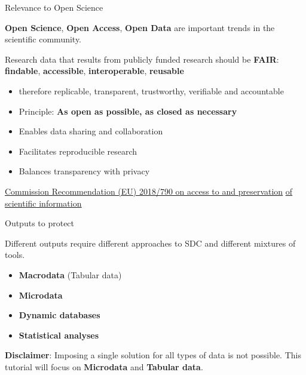 \documentclass[
	aspectratio = 169
 ]{beamer}
\begin{document}
\begin{frame}{Relevance to Open Science}

\textbf{Open Science}, \textbf{Open Access}, \textbf{Open Data} are
important trends in the scientific community.

Research data that results from publicly funded research should be
\textbf{FAIR}: \newline \textbf{findable}, \textbf{accessible},
\textbf{interoperable}, \textbf{reusable}

\begin{itemize}
\item
  therefore replicable, transparent, trustworthy, verifiable and accountable
\item
  Principle: \textbf{As open as possible, as closed as necessary}
\item
  Enables data sharing and collaboration
\item
  Facilitates reproducible research
\item
  Balances transparency with privacy
\end{itemize}

\href{https://eur-lex.europa.eu/eli/reco/2018/790/oj}{\color{blue}\underline{Commission Recommendation (EU) 2018/790 on access to and preservation}}
\href{https://eur-lex.europa.eu/eli/reco/2018/790/oj}{\color{blue}\underline{of scientific information}}

\end{frame}
\begin{frame}{Outputs to protect}

Different outputs require different approaches to SDC and different
mixtures of tools.

\begin{itemize}
\tightlist
\item
  \textbf{Macrodata} (Tabular data)
\item
  \textbf{Microdata}
\item
  \textbf{Dynamic databases}
\item
  \textbf{Statistical analyses}
\end{itemize}

\vspace{1cm}

\textbf{Disclaimer}: Imposing a single solution for all types of data is
not possible. \newline This tutorial will focus on \textbf{Microdata} and \textbf{Tabular
data}.

\end{frame}
\end{document}
